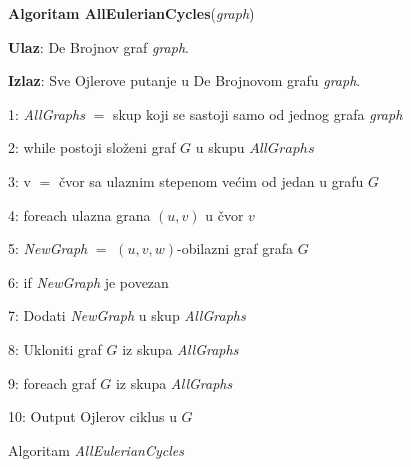 \documentclass[12pt,oneside]{memoir}
\begin{document}
\begin{figure}[!ht]
\begin{tcolorbox}
\textbf{Algoritam AllEulerianCycles}(\textit{graph})

\textbf{Ulaz}:  De Brojnov graf \textit{graph}.

\textbf{Izlaz}: Sve Ojlerove putanje u De Brojnovom grafu \textit{graph}.

1: \textit{AllGraphs} $=$ skup koji se sastoji samo od jednog grafa \textit{graph}

2: while postoji složeni graf $G$ u skupu $AllGraphs$

3:\hspace{1cm} v $=$ čvor sa ulaznim stepenom većim od jedan u grafu $G$

4:\hspace{1cm} foreach ulazna grana $(u, v)$ u čvor $v$
    
5:\hspace{2cm} \textit{NewGraph} $=$ $(u, v, w)$-obilazni graf grafa $G$

6:\hspace{2cm} if \textit{NewGraph} je povezan

7:\hspace{3cm} Dodati \textit{NewGraph} u skup \textit{AllGraphs}

8:\hspace{1cm} Ukloniti graf $G$ iz skupa \textit{AllGraphs}

9: foreach graf $G$ iz skupa \textit{AllGraphs}

10:\hspace{1cm} Output Ojlerov ciklus u $G$
\end{tcolorbox}
\caption{Algoritam \textit{AllEulerianCycles} \cite{bioinformaticsAlg}}
\label{box:allEulerianCycles}
\end{figure}
\end{document}
